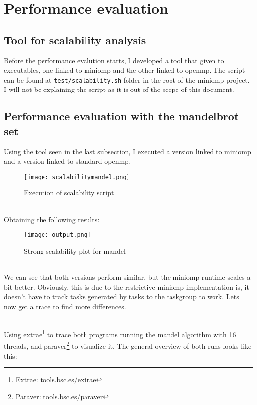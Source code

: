 \section{Performance evaluation}
\subsection{Tool for scalability analysis}
Before the performance evalution starts, I developed a tool that given to executables, one linked to miniomp and the other linked to openmp. The script can be found at \texttt{test/scalability.sh} folder in the root of the miniomp project. I will not be explaining the script as it is out of the scope of this document. 
\subsection{Performance evaluation with the mandelbrot set}
Using the tool seen in the last subsection, I executed a version linked to miniomp and a version linked to standard openmp.
\begin{figure}[h!]
    \centering
    \texttt{[image: scalabilitymandel.png]}
    \caption{Execution of scalability script}
\end{figure}
\par ~\\
Obtaining the following results:
\begin{figure}[h!]
    \centering
    \texttt{[image: output.png]}
    \caption{Strong scalability plot for mandel}
\end{figure}
\par ~\\
We can see that both versions perform similar, but the miniomp runtime scales a bit better. Obviously, this is due to the restrictive miniomp implementation is, it doesn't have to track tasks generated by tasks to the taskgroup to work. Lets now get a trace to find more differences.

\par ~\\
Using extrae\footnote{Extrae: \url{tools.bsc.es/extrae}} to trace both programs running the mandel algorithm with 16 threads, and paraver\footnote{Paraver: \url{tools.bsc.es/paraver}} to visualize it. The general overview of both runs looks like this:


